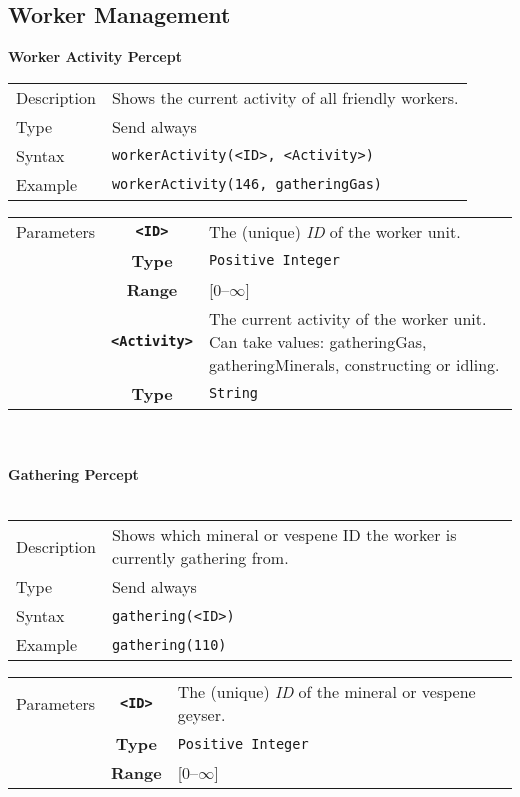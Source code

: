 \subsection{Worker Management}
\textbf{Worker Activity Percept}
\\
\begin{tabularx}{\textwidth}{lX}
 Description & Shows the current activity of all friendly workers. \\
 Type & Send always \\
 Syntax & \verb|workerActivity(<ID>, <Activity>)| \\
 Example & \verb|workerActivity(146, gatheringGas)| \\ 
 \end{tabularx}
 \begin{tabularx}{\textwidth}{l | c | p{8cm}|}
 \cline{2-3} 
 Parameters & \textbf{\verb|<ID>|} & The (unique) \textit{ID} of the worker unit. \\
            & \textbf{Type} & \verb|Positive Integer| \\
            & \textbf{Range} & [0--$\infty$] \\
            \cline{2-3} 
            & \textbf{\verb|<Activity>|} & The current activity of the worker unit. Can take values: gatheringGas, gatheringMinerals, constructing or idling. \\
            & \textbf{Type} & \verb|String| \\
            \cline{2-3} 
\end{tabularx}\\
\\
\newpage
\noindent
\textbf{Gathering Percept} \\
\\
\begin{tabularx}{\textwidth}{lX}
 Description & Shows which mineral or vespene ID the worker is currently gathering from. \\
 Type & Send always \\
 Syntax & \verb|gathering(<ID>)| \\
 Example & \verb|gathering(110)| \\ 
 \end{tabularx}
 \begin{tabularx}{\textwidth}{l | c | p{8cm}|}
 \cline{2-3} 
 Parameters & \textbf{\verb|<ID>|} & The (unique) \textit{ID} of the mineral or vespene geyser. \\
            & \textbf{Type} & \verb|Positive Integer| \\
            & \textbf{Range} & [0--$\infty$] \\
            \cline{2-3} 
\end{tabularx}\\

